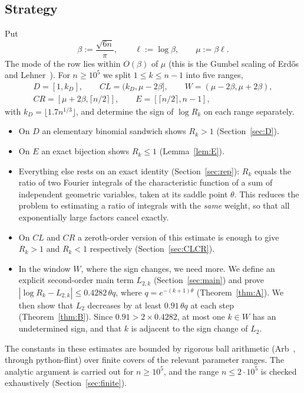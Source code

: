 \documentclass[11pt]{amsart}
\theoremstyle{definition}
\theoremstyle{remark}
\numberwithin{equation}{section}
\begin{document}
\subsection*{Strategy}
Put
\begin{equation}\label{eq:beta}
  \beta:=\frac{\sqrt{6n}}{\pi},\qquad \ell:=\log\beta,\qquad \mu:=\beta\ell .
\end{equation}
The mode of the row lies within $O(\beta)$ of $\mu$ (this is the Gumbel scaling of Erd\H{o}s and Lehner~\cite{EL41}).
For $n\ge10^5$ we split $1\le k\le n-1$ into five ranges,
\[
\begin{gathered}
  D=[1,k_D],\qquad CL=(k_D,\mu-2\beta],\qquad W=(\mu-2\beta,\mu+2\beta),\\
  CR=[\mu+2\beta,\lceil n/2\rceil],\qquad E=[\lceil n/2\rceil,n-1],
\end{gathered}
\]
with $k_D=\lfloor1.7n^{1/3}\rfloor$, and determine the sign of $\log R_k$ on each range separately.

\begin{itemize}
\item On $D$ an elementary binomial sandwich shows $R_k>1$ (Section~\ref{sec:D}).
\item On $E$ an exact bijection shows $R_k\le1$ (Lemma~\ref{lem:E}).
\item Everything else rests on an exact identity (Section~\ref{sec:rep}): $R_k$ equals the ratio of two Fourier integrals
  of the characteristic function of a sum of independent geometric variables, taken at its saddle point $\theta$. This
  reduces the problem to estimating a ratio of integrals with the \emph{same} weight, so that all exponentially large factors
  cancel exactly.
\item On $CL$ and $CR$ a zeroth-order version of this estimate is enough to give $R_k>1$ and $R_k<1$ respectively
  (Section~\ref{sec:CLCR}).
\item In the window $W$, where the sign changes, we need more. We define an explicit second-order main term $L_{2,k}$
  (Section~\ref{sec:main}) and prove $|\log R_k-L_{2,k}|\le 0.4282\,\theta q$, where $q=e^{-(k+1)\theta}$ (Theorem~\ref{thm:A}).
  We then show that $L_2$ decreases by at least $0.91\,\theta q$ at each step (Theorem~\ref{thm:B}). Since
  $0.91>2\times0.4282$, at most one $k\in W$ has an undetermined sign, and that $k$ is adjacent to the sign change of $L_2$.
\end{itemize}

The constants in these estimates are bounded by rigorous ball arithmetic (Arb~\cite{Arb}, through python-flint) over finite
covers of the relevant parameter ranges. The analytic argument is carried out for $n\ge10^5$, and the range $n\le2\cdot10^5$
is checked exhaustively (Section~\ref{sec:finite}).
\end{document}
